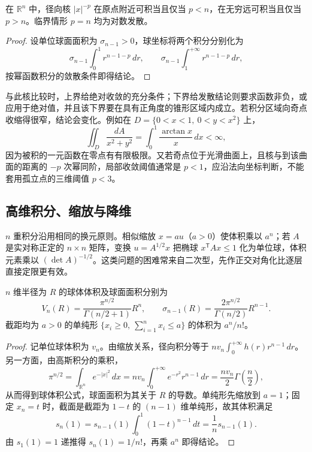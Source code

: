 \begin{proposition}
\label{prop:pei-radial-singularity}
在 $\mathbb R^n$ 中，径向核 $|x|^{-p}$ 在原点附近可积当且仅当 $p<n$，在无穷远可积当且仅当 $p>n$。临界情形 $p=n$ 均为对数发散。
\end{proposition}
\begin{proof}
设单位球面面积为 $\sigma_{n-1}>0$，球坐标将两个积分分别化为
\[
\sigma_{n-1}\int_0^1r^{n-1-p}\,dr,
\qquad
\sigma_{n-1}\int_1^{+\infty}r^{n-1-p}\,dr,
\]
按幂函数积分的敛散条件即得结论。
\end{proof}

与此核比较时，上界给绝对收敛的充分条件；下界给发散结论则要求函数非负，或应用于绝对值，并且该下界要在具有正角度的锥形区域内成立。若积分区域向奇点收缩得很窄，结论会变化。例如在 $D=\{0<x<1,\ 0<y<x^2\}$ 上，
\[
\iint_D\frac{dA}{x^2+y^2}
=\int_0^1\frac{\arctan x}{x}\,dx<\infty,
\]
因为被积的一元函数在零点有有限极限。又若奇点位于光滑曲面上，且核与到该曲面的距离的 $-p$ 次幂同阶，局部收敛阈值通常是 $p<1$，应沿法向坐标判断，不能套用孤立点的三维阈值 $p<3$。

\subsection{高维积分、缩放与降维}

$n$ 重积分沿用相同的换元原则。相似缩放 $x=au$（$a>0$）使体积乘以 $a^n$；若 $A$ 是实对称正定的 $n\times n$ 矩阵，变换 $u=A^{1/2}x$ 把椭球 $x^{\mathsf T}Ax\le1$ 化为单位球，体积元素乘以 $(\det A)^{-1/2}$。这类问题的困难常来自二次型，先作正交对角化比逐层直接定限更有效。

\begin{proposition}
\label{prop:pei-ball-simplex}
$n$ 维半径为 $R$ 的球体体积及球面面积分别为
\begin{equation}
\label{eq:pei-ball-volume}
V_n(R)=\frac{\pi^{n/2}}{\Gamma(n/2+1)}R^n,
\qquad
\sigma_{n-1}(R)=\frac{2\pi^{n/2}}{\Gamma(n/2)}R^{n-1}.
\end{equation}
截距均为 $a>0$ 的单纯形
$\{x_i\ge0,\ \sum_{i=1}^nx_i\le a\}$ 的体积为 $a^n/n!$。
\end{proposition}
\begin{proof}
记单位球体积为 $v_n$。由缩放关系，径向积分等于 $nv_n\int_0^{+\infty}h(r)r^{n-1}\,dr$。另一方面，由高斯积分的乘积，
\[
\pi^{n/2}=\int_{\mathbb R^n}e^{-|x|^2}\,dx
=nv_n\int_0^{+\infty}e^{-r^2}r^{n-1}\,dr
=\frac{nv_n}{2}\Gamma\!\left(\frac n2\right),
\]
从而得到球体积公式，球面面积为其关于 $R$ 的导数。单纯形先缩放到 $a=1$；固定 $x_n=t$ 时，截面是截距为 $1-t$ 的 $(n-1)$ 维单纯形，故其体积满足
\[
s_n(1)=s_{n-1}(1)\int_0^1(1-t)^{n-1}\,dt
=\frac1n s_{n-1}(1).
\]
由 $s_1(1)=1$ 递推得 $s_n(1)=1/n!$，再乘 $a^n$ 即得结论。
\end{proof}

